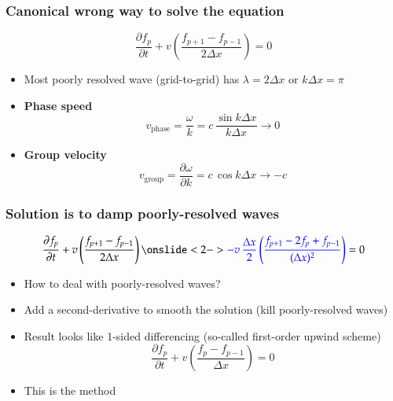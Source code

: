 \begin{frame}
  \frametitle{Canonical wrong way to solve the equation}
\begin{tcolorbox}
\begin{equation*}
\frac{\partial f_p}{\partial t} + v \left( \frac{f_{p+1}-f_{p-1}}{2\Delta x} \right) = 0
\end{equation*}
\end{tcolorbox}
\begin{itemize}
\item<1-> Most poorly resolved wave (grid-to-grid) has $\lambda = 2 \Delta x$ or $k\Delta x = \pi$
\item<2-> \textbf{Phase speed}
\begin{equation*}
  v_\mathrm{phase} = \frac{\omega}{k} =  c \, \frac{\sin k\Delta x}{k \Delta x}
  \longrightarrow 0
\end{equation*}
\item<3-> \textbf{Group velocity}
\begin{equation*}
  v_\mathrm{group} = \frac{\partial \omega}{\partial k} =  c \, \cos k\Delta x
  \longrightarrow -c
\end{equation*}
\end{itemize}
\end{frame}
\begin{frame}
  \frametitle{Solution is to damp poorly-resolved waves}
\begin{tcolorbox}
\begin{equation*}
  \frac{\partial f_p}{\partial t} + v \left( \frac{f_{p+1}-f_{p-1}}{2\Delta x} \right)
  \onslide<2->{\textcolor{blue}{- v  \, \frac{\Delta x}{2} \left( \frac{f_{p+1}-2f_p+f_{p-1}}{(\Delta x)^2} \right)}} = 0
\end{equation*}
\end{tcolorbox}
\begin{itemize}
\item<2-> How to deal with poorly-resolved waves?
\item<3-> Add a second-derivative to smooth the solution (kill poorly-resolved waves)
\item<4-> Result looks like 1-sided differencing (so-called first-order upwind scheme)
\begin{equation*}
  \frac{\partial f_p}{\partial t} + v \left( \frac{f_{p}-f_{p-1}}{\Delta x} \right) = 0
\end{equation*}
\item<5->This is the  method
\end{itemize}

\end{frame}

